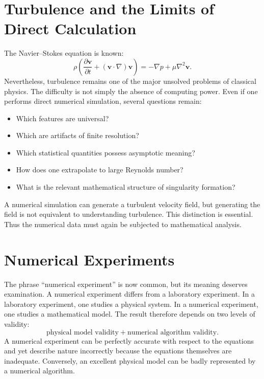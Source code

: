 \section{ Turbulence and the Limits of Direct Calculation}
The Navier--Stokes equation is known:
\[\rho\left(\frac{\partial\mathbf{v}}{\partial t}+
(\mathbf{v}\cdot\nabla)\mathbf{v}\right)=-\nabla p+
\mu\nabla^2\mathbf{v}.
\]
Nevertheless, turbulence remains one of the major unsolved problems of classical physics.
The difficulty is not simply the absence of computing power.
Even if one performs direct numerical simulation, several questions remain:
\begin{itemize}
\item Which features are universal?
\item Which are artifacts of finite resolution?
\item Which statistical quantities possess asymptotic meaning?
\item How does one extrapolate to large Reynolds number?
\item What is the relevant mathematical structure of singularity formation?
\end{itemize}
A numerical simulation can generate a turbulent velocity field, but generating
the field is not equivalent to understanding turbulence.
This distinction is essential.
Thus the numerical data must again be subjected to mathematical analysis.

\section{ Numerical Experiments}
The phrase ``numerical experiment'' is now common, but its meaning deserves examination.
A numerical experiment differs from a laboratory experiment.
In a laboratory experiment, one studies a physical system.
In a numerical experiment, one studies a mathematical model.
The result therefore depends on two levels of validity:
\[\boxed{\text{physical model validity}+\text{numerical algorithm validity}.}\]
A numerical experiment can be perfectly accurate with respect to the equations
and yet describe nature incorrectly because the equations themselves are
inadequate.
Conversely, an excellent physical model can be badly represented by a numerical
algorithm.

